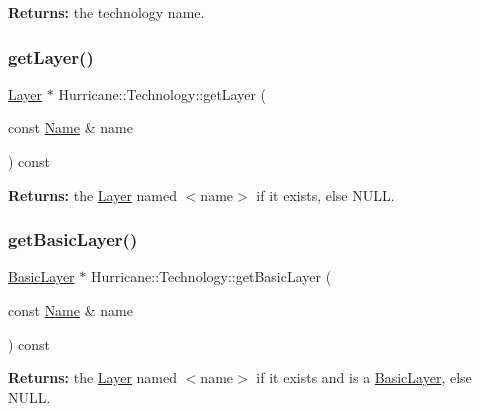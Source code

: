 {\bfseries Returns\+:} the technology name. \mbox{\label{classHurricane_1_1Technology_a4ec69c9f8f6b483885f1900c56a97b61}} 
\subsubsection{\texorpdfstring{get\+Layer()}{getLayer()}\hspace{0.1cm}{\footnotesize\ttfamily [1/2]}}
{\footnotesize\ttfamily \mbox{\hyperlink{classHurricane_1_1Layer}{Layer}} $\ast$ Hurricane\+::\+Technology\+::get\+Layer (\begin{DoxyParamCaption}\item[{const \mbox{\hyperlink{classHurricane_1_1Name}{Name}} \&}]{name }\end{DoxyParamCaption}) const\hspace{0.3cm}{\ttfamily [inline]}}

{\bfseries Returns\+:} the \mbox{\hyperlink{classHurricane_1_1Layer}{Layer}} named {\ttfamily $<$name$>$} if it exists, else {\ttfamily N\+U\+LL}. \mbox{\label{classHurricane_1_1Technology_ab096154ce9485cef02244f0037efd4fb}} 
\subsubsection{\texorpdfstring{get\+Basic\+Layer()}{getBasicLayer()}}
{\footnotesize\ttfamily \mbox{\hyperlink{classHurricane_1_1BasicLayer}{Basic\+Layer}} $\ast$ Hurricane\+::\+Technology\+::get\+Basic\+Layer (\begin{DoxyParamCaption}\item[{const \mbox{\hyperlink{classHurricane_1_1Name}{Name}} \&}]{name }\end{DoxyParamCaption}) const}

{\bfseries Returns\+:} the \mbox{\hyperlink{classHurricane_1_1Layer}{Layer}} named {\ttfamily $<$name$>$} if it exists and is a \mbox{\hyperlink{classHurricane_1_1BasicLayer}{Basic\+Layer}}, else {\ttfamily N\+U\+LL}. \mbox{\label{classHurricane_1_1Technology_a0e93f2f749ee9b6efd30de4ef74546cc}} 
